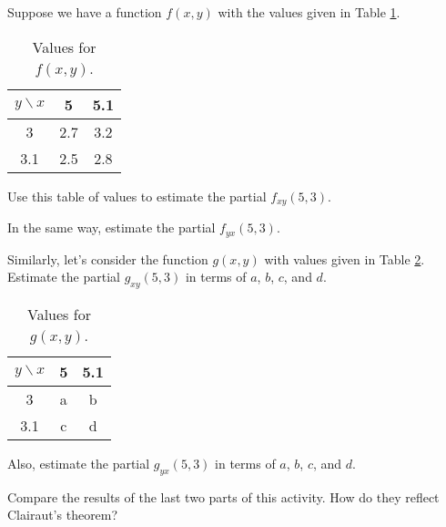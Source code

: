 \begin{activity} \label{A:10.3.7}  Suppose we have a function $f(x,y)$
  with the values given in Table \ref{T:10.3.activity.1}.

\begin{table}[ht]
  \begin{center}
    \begin{tabular}{|c||c|c|}
      \hline
      $y \backslash x$ & 5 & 5.1 \\
      \hline
      \hline
      3 & 2.7 & 3.2 \\
      \hline
      3.1 & 2.5 & 2.8 \\
      \hline
    \end{tabular}
    \caption{Values for $f(x,y)$.}
    \label{T:10.3.activity.1}
  \end{center}
\end{table}

\ba
\item Use this table of values to estimate the partial $f_{xy}(5,
  3)$.  

\item In the same way, estimate the partial $f_{yx}(5,3)$. 

\item Similarly, let's consider the function $g(x,y)$ with
  values given in Table \ref{T:10.3.activity.2}.  Estimate the partial
  $g_{xy}(5,3)$ in terms of $a$, $b$, $c$, and $d$.

\begin{table}[ht]
  \begin{center}
    \begin{tabular}{|c||c|c|}
      \hline
      $y \backslash x$ & 5 & 5.1 \\
      \hline
      \hline
      3 & a & b \\
      \hline
      3.1 & c & d \\
      \hline
    \end{tabular}
    \caption{Values for $g(x,y)$.}
    \label{T:10.3.activity.2}
  \end{center}
\end{table}

\item Also, estimate the partial $g_{yx}(5,3)$ in terms of $a$, $b$,
  $c$, and $d$.

\item Compare the results of the last two parts of this activity.
  How do they reflect Clairaut's theorem?

\ea
\end{activity}
\aftera
